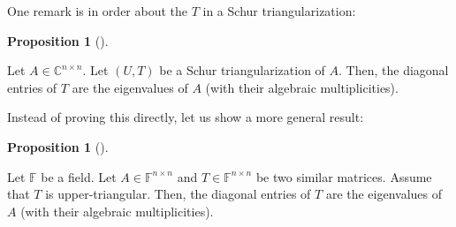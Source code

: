 \documentclass[numbers=enddot,12pt,final,onecolumn,notitlepage]{scrartcl}%
\numberwithin{exer}{subsection}
\theoremstyle{definition}
\newtheorem{prop}[theo]{Proposition}
\newenvironment{proposition}[1][]
{\begin{prop}[#1]\begin{leftbar}}
{\end{leftbar}\end{prop}}
\begin{document}
One remark is in order about the $T$ in a Schur triangularization:

\begin{proposition}
\label{prop.schurtri.schurtri.T-diag}Let $A\in\mathbb{C}^{n\times n}$. Let
$\left(  U,T\right)  $ be a Schur triangularization of $A$. Then, the diagonal
entries of $T$ are the eigenvalues of $A$ (with their algebraic multiplicities).
\end{proposition}

Instead of proving this directly, let us show a more general result:

\begin{proposition}
\label{prop.schurtri.similar.T-diag}Let $\mathbb{F}$ be a field. Let
$A\in\mathbb{F}^{n\times n}$ and $T\in\mathbb{F}^{n\times n}$ be two similar
matrices. Assume that $T$ is upper-triangular. Then, the diagonal entries of
$T$ are the eigenvalues of $A$ (with their algebraic multiplicities).
\end{proposition}
\end{document}
